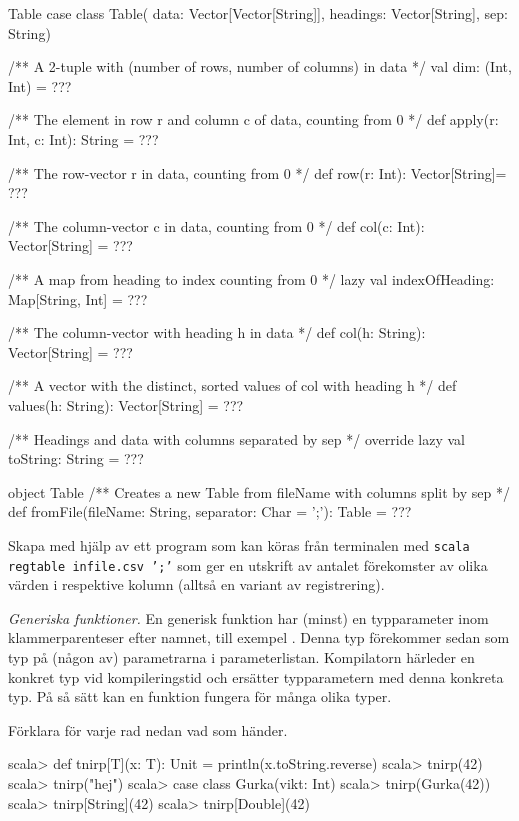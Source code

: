 \clearpage
\begin{ScalaSpec}{Table}
case class Table(
  data: Vector[Vector[String]],
  headings: Vector[String],
  sep: String){
  /** A 2-tuple with (number of rows, number of columns) in data */
  val dim: (Int, Int) = ???

  /** The element in row r and column c of data, counting from 0 */
  def apply(r: Int, c: Int): String = ???

  /** The row-vector r in data, counting from 0 */
  def row(r: Int): Vector[String]= ???

  /** The column-vector c in data, counting from 0 */
  def col(c: Int): Vector[String] = ???

  /** A map from heading to index counting from 0 */
  lazy val indexOfHeading: Map[String, Int] = ???

  /** The column-vector with heading h in data */
  def col(h: String): Vector[String] = ???

  /** A vector with the distinct, sorted values of col with heading h */
  def values(h: String): Vector[String] = ???

  /** Headings and data with columns separated by sep */
  override lazy val toString: String = ???
}
object Table {
  /** Creates a new Table from fileName with columns split by sep */
  def fromFile(fileName: String, separator: Char = ';'): Table = ???
}
\end{ScalaSpec}




\Subtask Skapa med hjälp av  ett program som kan köras från terminalen med \texttt{scala regtable infile.csv ';'} som ger en utskrift av antalet förekomster av olika värden i respektive kolumn (alltså en variant av registrering).


\Task \emph{Generiska funktioner.} En generisk funktion har (minst) en typparameter inom klammerparenteser efter namnet, till exempel \code{[T]}. Denna typ förekommer sedan som typ på (någon av) parametrarna i parameterlistan. Kompilatorn härleder en konkret typ vid kompileringstid och ersätter typparametern med denna konkreta typ. På så sätt kan en funktion fungera för många olika typer.

\Subtask Förklara för varje rad nedan vad som händer.

\begin{REPL}
scala> def tnirp[T](x: T): Unit = println(x.toString.reverse)
scala> tnirp(42)
scala> tnirp("hej")
scala> case class Gurka(vikt: Int)
scala> tnirp(Gurka(42))
scala> tnirp[String](42)
scala> tnirp[Double](42)
\end{REPL}

